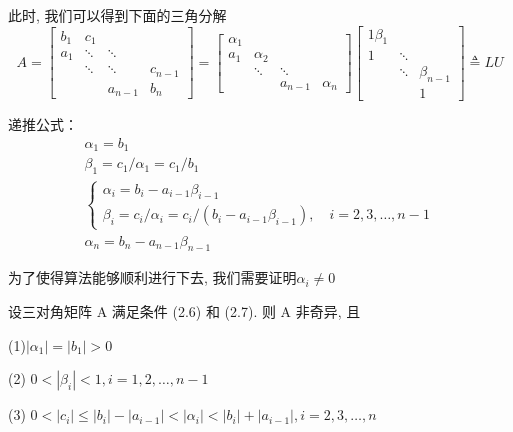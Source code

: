 \documentclass[12pt,a4paper]{article}
\begin{document}
此时, 我们可以得到下面的三角分解
\begin{equation}
A=\left[\begin{array}{cccc}{b_{1}} & {c_{1}} & {} & {} \\ {a_{1}} & {\ddots} & {\ddots} & {} \\ {} & {\ddots} & {\ddots} & {c_{n-1}} \\ {} & {} & {a_{n-1}} & {b_{n}}\end{array}\right]=\left[\begin{array}{cccc}{\alpha_{1}} & {} & {} & {} \\ {a_{1}} & {\alpha_{2}} & {} & {} \\ {} & {\ddots} & {\ddots} & {} \\ {} & {} & {a_{n-1}} & {\alpha_{n}}\end{array}\right]\left[\begin{array}{cccc}{1 \beta_{1}} \\ {1} & {\ddots} \\ {} & {\ddots} & {\beta_{n-1}} \\ {} & {} & {1}\end{array}\right] \triangleq L U
\end{equation}

递推公式：
\begin{equation}
\begin{array}{l}{\alpha_{1}=b_{1}} 
\\ {\beta_{1}=c_{1} / \alpha_{1}=c_{1} / b_{1}} 
\\ {\left\{\begin{array}{l}{\alpha_{i}=b_{i}-a_{i-1} \beta_{i-1}} \\ {\beta_{i}=c_{i} / \alpha_{i}=c_{i} /\left(b_{i}-a_{i-1} \beta_{i-1}\right), \quad i=2,3, \ldots, n-1} \end{array}\right.}\\ {\alpha_{n}=b_{n}-a_{n-1} \beta_{n-1}}\end{array}
\end{equation}

为了使得算法能够顺利进行下去, 我们需要证明$\alpha_{i} \neq 0$


\begin{theorem}
	设三对角矩阵 A 满足条件 (2.6) 和 (2.7). 则 A 非奇异, 且
	
	(1)$\left|\alpha_{1}\right|=\left|b_{1}\right|>0$
	
	(2) $0<\left|\beta_{i}\right|<1, i=1,2, \ldots, n-1$
	
	(3)	$0<\left|c_{i}\right| \leq\left|b_{i}\right|-\left|a_{i-1}\right|<\left|\alpha_{i}\right|<\left|b_{i}\right|+\left|a_{i-1}\right|, i=2,3, \ldots, n$
\end{theorem}
\end{document}
